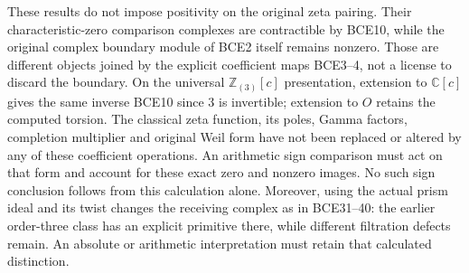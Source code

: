 These results do not impose positivity on the original zeta
pairing. Their characteristic-zero comparison complexes are
contractible by BCE10, while the original complex boundary
module of BCE2 itself remains nonzero. Those are different
objects joined by the explicit coefficient maps BCE3--4,
not a license to discard the boundary. On the universal
\(\mathbb Z_{(3)}[c]\) presentation, extension to
\(\mathbb C[c]\) gives the same inverse BCE10 since 3 is
invertible; extension to \(O\) retains the computed torsion.
The classical zeta function, its poles, Gamma factors,
completion multiplier and original Weil form have not been
replaced or altered by any of these coefficient operations.
An arithmetic sign comparison must act on that form and
account for these exact zero and nonzero images. No such
sign conclusion follows from this calculation alone.
Moreover, using the actual prism ideal and its twist changes
the receiving complex as in BCE31--40: the earlier order-three
class has an explicit primitive there, while different
filtration defects remain. An absolute or arithmetic
interpretation must retain that calculated distinction.


